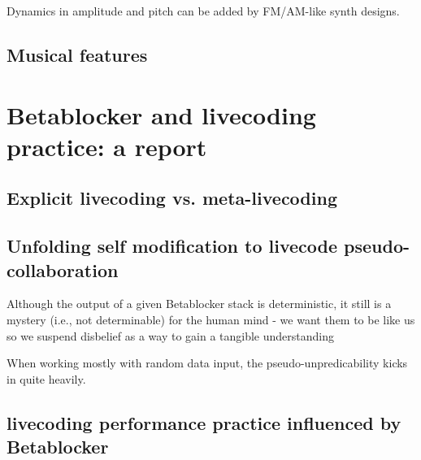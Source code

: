 \documentclass[letterpaper, 12pt]{article}
\begin{document}
Dynamics in amplitude and pitch can be added by FM/AM-like synth designs.



\subsection{Musical features} 
\label{sub:musical_features}



\section{Betablocker and livecoding practice: a report} 
\label{sec:betablocker_and_livecoding_practice_a_report}

\subsection{Explicit livecoding vs. meta-livecoding} 
\label{sub:explicit_livecoding_}



\subsection{Unfolding self modification to livecode pseudo-collaboration} 
\label{sec:unfolding_self_modification_to_livecode_collaboration}

Although the output of a given Betablocker stack is deterministic, it still is a mystery (i.e., not determinable) for the human mind - we want them to be like us so we suspend disbelief as a way to gain a tangible understanding

When working mostly with random data input, the pseudo-unpredicability kicks in quite heavily. 



\subsection{livecoding performance practice influenced by Betablocker}
\label{sub:livecoding_performance_practice_influenced_by_betablocker}
\end{document}
